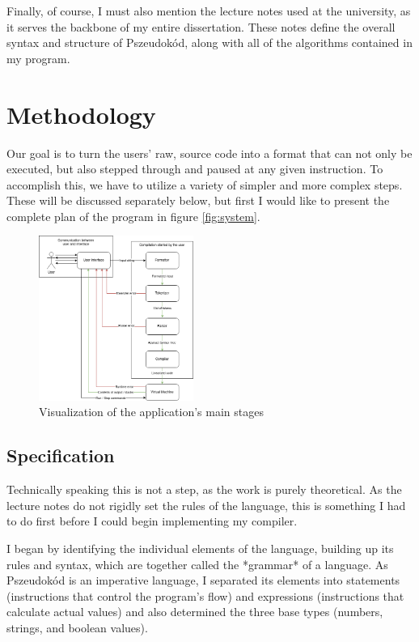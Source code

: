 \documentclass[conference]{IEEEtran}
\begin{document}
Finally, of course, I must also mention the lecture notes used at the university, as it serves the backbone of my entire dissertation. These notes define the overall syntax and structure of Pszeudokód, along with all of the algorithms contained in my program.

\section{Methodology}

Our goal is to turn the users' raw, source code into a format that can not only be executed, but also stepped through and paused at any given instruction. To accomplish this, we have to utilize a variety of simpler and more complex steps. These will be discussed separately below, but first I would like to present the complete plan of the program in figure \eqref{fig:system}.

\begin{figure}[htbp]
\centerline{\includegraphics[width=0.45\textwidth]{rendszerterv_en.png}}
\caption{Visualization of the application's main stages}
\label{fig:system}
\end{figure}

\subsection{Specification}

Technically speaking this is not a step, as the work is purely theoretical. As the lecture notes do not rigidly set the rules of the language, this is something I had to do first before I could begin implementing my compiler.

I began by identifying the individual elements of the language, building up its rules and syntax, which are together called the *grammar* of a language. As Pszeudokód is an imperative language, I separated its elements into statements (instructions that control the program's flow) and expressions (instructions that calculate actual values) and also determined the three base types (numbers, strings, and boolean values).
\end{document}
